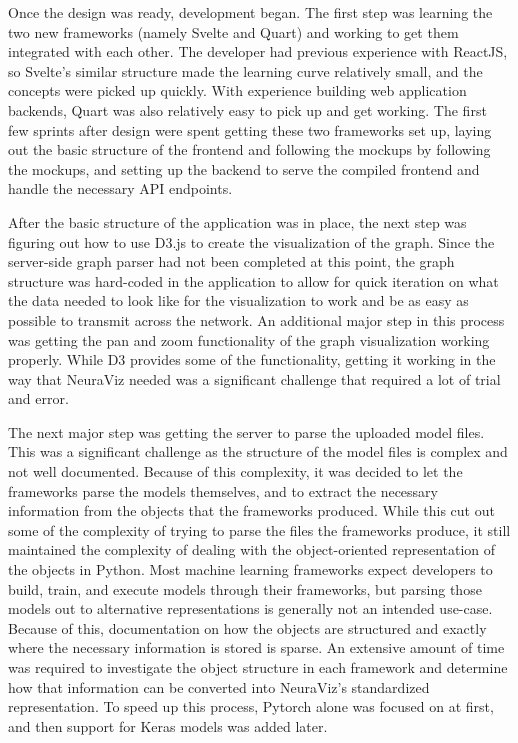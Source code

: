Once the design was ready, development began. The first step was learning the two new frameworks (namely Svelte and Quart) and working to get them integrated with each other. The developer had previous experience with ReactJS, so Svelte's similar structure made the learning curve relatively small, and the concepts were picked up quickly. With experience building web application backends, Quart was also relatively easy to pick up and get working. The first few sprints after design were spent getting these two frameworks set up, laying out the basic structure of the frontend and following the mockups by following the mockups, and setting up the backend to serve the compiled frontend and handle the necessary API endpoints.

After the basic structure of the application was in place, the next step was figuring out how to use D3.js to create the visualization of the graph. Since the server-side graph parser had not been completed at this point, the graph structure was hard-coded in the application to allow for quick iteration on what the data needed to look like for the visualization to work and be as easy as possible to transmit across the network. An additional major step in this process was getting the pan and zoom functionality of the graph visualization working properly. While D3 provides some of the functionality, getting it working in the way that NeuraViz needed was a significant challenge that required a lot of trial and error.

The next major step was getting the server to parse the uploaded model files. This was a significant challenge as the structure of the model files is complex and not well documented. Because of this complexity, it was decided to let the frameworks parse the models themselves, and to extract the necessary information from the objects that the frameworks produced. While this cut out some of the complexity of trying to parse the files the frameworks produce, it still maintained the complexity of dealing with the object-oriented representation of the objects in Python. Most machine learning frameworks expect developers to build, train, and execute models through their frameworks, but parsing those models out to alternative representations is generally not an intended use-case. Because of this, documentation on how the objects are structured and exactly where the necessary information is stored is sparse. An extensive amount of time was required to investigate the object structure in each framework and determine how that information can be converted into NeuraViz's standardized representation. To speed up this process, Pytorch alone was focused on at first, and then support for Keras models was added later.

